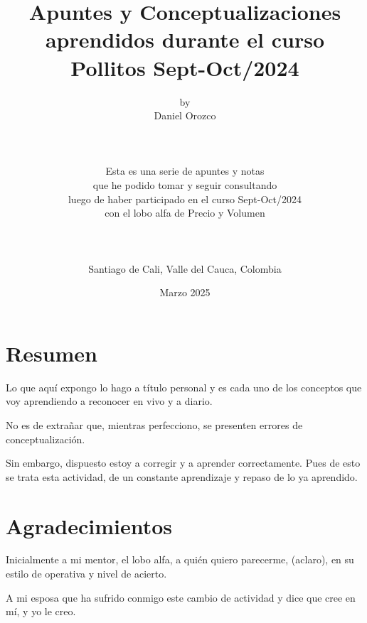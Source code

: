 \title{Apuntes y Conceptualizaciones aprendidos durante el curso Pollitos Sept-Oct/2024}
\author{by\\Daniel Orozco
\\
\\
\\
\\Esta es una serie de apuntes y notas
\\que he podido tomar y seguir consultando
\\luego de haber participado en el curso Sept-Oct/2024
\\con el lobo alfa de Precio y Volumen
\\
\\
\\
\\Santiago de Cali, Valle del Cauca, Colombia
}
\date{Marzo 2025}
\maketitle

\chapter*{Resumen}

Lo que aqu\'i expongo lo hago a t\'itulo personal y es cada uno de los conceptos que voy aprendiendo a reconocer en vivo y a diario.

No es de extra\~{n}ar que, mientras perfecciono, se presenten errores de conceptualizaci\'on.

Sin embargo, dispuesto estoy a corregir y a aprender correctamente. Pues de esto se trata esta actividad, de un constante aprendizaje y repaso de lo ya aprendido.

\chapter*{Agradecimientos}

Inicialmente a mi mentor, el lobo alfa, a qui\'en quiero parecerme, (aclaro), en su estilo de operativa y nivel de acierto. 

A mi esposa que ha sufrido conmigo este cambio de actividad y dice que cree en m\'i, y yo le creo.

\newpage